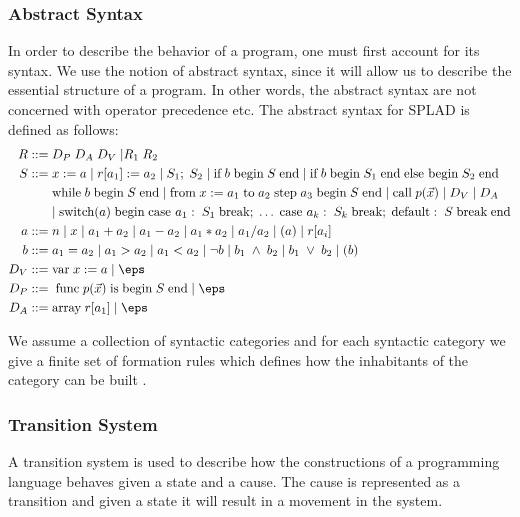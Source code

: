 \subsubsection{Abstract Syntax}
In order to describe the behavior of a program, one must first account for its syntax. We use the notion of abstract syntax, since it will allow us to describe the essential structure of a program. In other words, the abstract syntax are not concerned with operator precedence etc. The abstract syntax for SPLAD is defined as follows: 
\begin{align*}
R ::= \; & D_P \; D_A \; D_V \; | R_1 \; R_2 \; \\
S::= \; & x := a \; | \; r[a_1] := a_2 \; | \; S_1; \; S_2 \; | \; \text{if} \; b \; \text{begin} \; S \; \text{end} \; | \; \text{if} \; b \; \text{begin} \; S_1 \; \text{end} \; \text{else begin} \; S_2 \; \text{end} \\
~ & \text{while} \; b \; \text{begin} \; S \; \text{end} \; | \; \text{from} \; x := a_1 \; \text{to} \; a_2 \; \text{step} \; a_3 \; \text{begin} \; S \; \text{end} \; | \; \text{call} \; p(\vec{x}) \; | \; D_V \; | \; D_A \; \\
~ & | \; \text{switch}(a) \; \text{begin} \; \text{case } a_1: \; S_1 \; \text{break}; \; \dots \; \text{case } a_k: \; S_k \; \text{break}; \; \text{default}: \; S \; \text{break} \; \text{end} \\
a::= \; & n \; | \; x \; | \; a_1 + a_2 \; | \; a_1 - a_2 \; | \; a_1 * a_2 \; | \; a_1 / a_2 \; | \; (a) \; | \; r[a_i]\\
b::= \; &a_1 = a_2 \; | \; a_1 > a_2 \; | \; a_1 < a_2 \; | \; \neg b \; | \; b_1 \; \wedge \; b_2 \; | \; b_1 \; \vee \; b_2 \; | \; (b)\\
D_V::= \; & \text{var} \; x := a \;|\; \eps\\
D_P::= \; & \; \text{func} \; p(\vec{x}) \; \text{is} \; \text{begin} \; S \; \text{end}  \;|\; \eps\\
D_A::= \; & \text{array} \; r[a_1]  \;|\; \eps\\
\end{align*}

We assume a collection of syntactic categories and for each syntactic category we give a finite set of formation rules which defines how the inhabitants of the category can be built \citep{HHTree}.

\subsubsection{Transition System}
A transition system is used to describe how the constructions of a programming language behaves given a state and a cause. The cause is represented as a transition and given a state it will result in a movement in the system.

